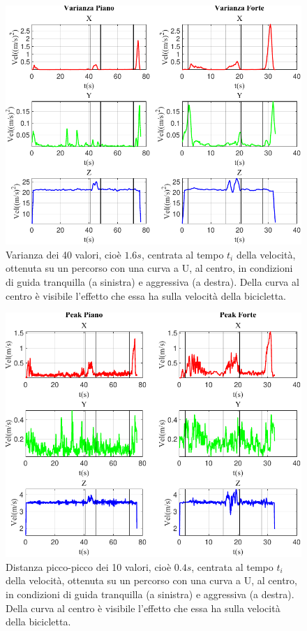 \documentclass[class=article]{standalone}
\begin{document}
	\begin{center}
		\begin{figure}[h!]
			\centering\includegraphics[width=.7\textwidth]{img/curvaUFP/Vel/Varianza}
			\caption[]{Varianza dei 40 valori, cioè \(1.6s\), centrata al tempo \(t_{i}\) della velocità, ottenuta su un percorso con una curva a U, al centro, in condizioni di guida tranquilla (a sinistra) e aggressiva (a destra). Della curva al centro è visibile l'effetto che essa ha sulla velocità della bicicletta.}
			\label{fig:VelVar_curvaUFP}
		\end{figure}
	\end{center}
	\newpage
	\begin{center}
		\begin{figure}[h!]
			\centering\includegraphics[width=.7\textwidth]{img/curvaUFP/Vel/Peak}
			\caption[]{Distanza picco-picco dei 10 valori, cioè \(0.4s\), centrata al tempo \(t_{i}\) della velocità, ottenuta su un percorso con una curva a U, al centro, in condizioni di guida tranquilla (a sinistra) e aggressiva (a destra). Della curva al centro è visibile l'effetto che essa ha sulla velocità della bicicletta.}
			\label{fig:VelPeak_curvaUFP}
		\end{figure}
	\end{center}
	
\end{document}
